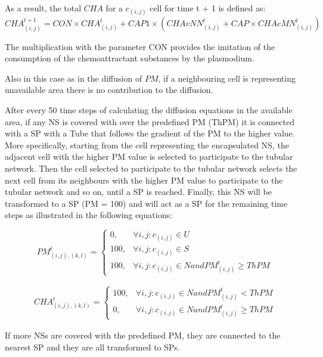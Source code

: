 As a result, the total $CHA$ for a $c_{(i,j)}$ cell for time t + 1 is defined as:
\begin{equation}
CHA^{t+1}_{(i, j)} = CON \times {CHA^t_{(i, j)} + CAP1 \times (CHAvNN^t_{(i, j)} + CAP \times CHAeMN^t_{(i, j)})}
\end{equation}

\par
The multiplication with the parameter CON provides the imitation of the consumption of the chemoattractant substances by the plasmodium.
\par
Also in this case as in the diffusion of $PM$, if a neighbouring cell is representing unavailable area there is no contribution to the diffusion.
\par
After every 50 time steps of calculating the diffusion equations in the available area, if any NS is covered with over the predefined PM (ThPM) it is connected with a SP with a Tube that follows the gradient of the PM to the higher value. More specifically, starting from the cell representing the encapsulated NS, the adjacent cell with the higher PM value is selected to participate to the tubular network. Then the cell selected to participate to the tubular network selects the next cell from its neighbours with the higher PM value to participate to the tubular network and so on, until a SP is reached.
Finally, this NS will be transformed to a SP (PM = 100) and will act as a SP for the remaining time steps as illustrated in the following equations:

\begin{equation}
PM^t_{(i, j),(k,l)}=
\begin{cases} 
0, & \forall i, j: c_{(i,j)} \in U \\ 
100, & \forall i, j: c_{(i,j)} \in S \\ 
100, & \forall i, j: c_{(i,j)} \in N and  PM^t_{(i, j)} \geq ThPM 
\end{cases}
\end{equation}

\begin{align}
CHA^t_{(i, j),(k,l)}=
\begin{cases} 
100, & \forall i, j: c_{(i,j)} \in N and PM^t_{(i, j)} < ThPM\\ 
0, & \forall i, j: c_{(i,j)} \in N and  PM^t_{(i, j)} \geq ThPM 
\end{cases}
\end{align}

If more NSs are covered with the predefined PM, they are connected to the nearest SP and they are all transformed to SPs.










